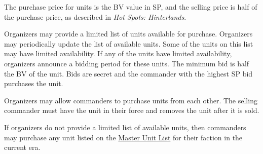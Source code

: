 The purchase price for units is the BV value in SP, and the selling price is half of the purchase price, as described in \emph{Hot Spots: Hinterlands}.

Organizers may provide a limited list of units available for purchase.
Organizers may periodically update the list of available units.
Some of the units on this list may have limited availability.
If any of the units have limited availability, organizers announce a bidding period for these units.
The minimum bid is half the BV of the unit.
Bids are secret and the commander with the highest SP bid purchases the unit.

Organizers may allow commanders to purchase units from each other.
The selling commander must have the unit in their force and removes the unit after it is sold.

If organizers do not provide a limited list of available units, then commanders may purchase any unit listed on the \href{http://www.masterunitlist.info}{Master Unit List} for their faction in the current era.
